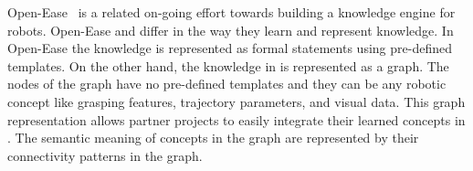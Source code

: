 Open-Ease~\cite{openease} is a related on-going effort towards building a knowledge engine for robots.
Open-Ease and \robobrain{} differ in the way they learn and represent knowledge. In Open-Ease the knowledge is represented as formal statements using pre-defined templates. On the other hand, the knowledge in \robobrain{} is represented as a graph. The nodes of the \robobrain{} graph have no pre-defined templates and they can be any robotic concept like grasping features, trajectory parameters, and visual data. This graph representation allows partner projects to easily integrate their learned concepts in \robobrain{}. The semantic meaning of concepts in the \robobrain{} graph are represented by their connectivity patterns in the graph. %
\iffalse
A closely related on-going effort is Open-Ease \cite{openease}
It focuses on a similar problem of cloud knowledge-base and inference engine for robots.
It is different from \robobrain{} in a way it incorporates knowledge and do inference.
Open-ease requires input to be in the form of a facts written in a formal logic statements following the pre-defined structure and uses an
inference engine designed for the language. On the other hand, \robobrain{} accepts unstructured information as nodes and their relations as edges.
\robobrain{} automatically infers the structure and it also infers the correctness and the latent semantic meaning. Our approach brings flexibility with the cost
of a technical challenges in inference and learning.
\fi
